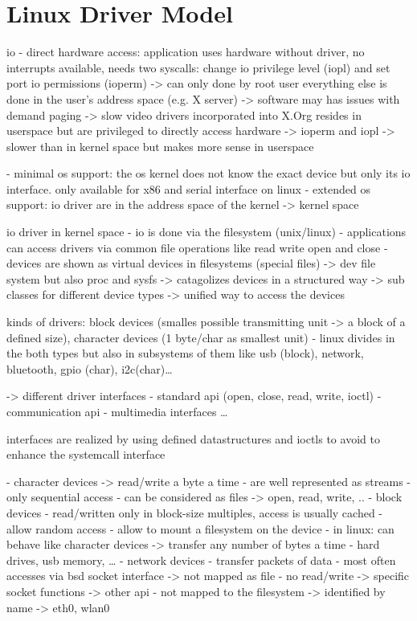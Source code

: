   
\section{Linux Driver Model}
\cite{glatz2015betriebssysteme}

io
- direct hardware access: application uses hardware without driver, no interrupts available, 
    needs two syscalls: change io privilege level (iopl) and set port io permissions (ioperm)
    -> can only done by root user
    everything else is done in the user's address space (e.g. X server) -> software may has issues with demand paging -> slow
    \cite{lfd430}
    video drivers incorporated into X.Org resides in userspace but are privileged to directly access hardware -> ioperm and iopl
    -> slower than in kernel space but makes more sense in userspace

- minimal os support: the os kernel does not know the exact device but only its io interface. only available for x86 and serial interface on linux
- extended os support: io driver are in the address space of the kernel -> kernel space

io driver in kernel space
- io is done via the filesystem (unix/linux)
- applications can access drivers via common file operations like read write open and close
    - devices are shown as virtual devices in filesystems (special files) -> dev file system but also proc and sysfs
    -> catagolizes devices in a structured way -> sub classes for different device types -> unified way to access the devices

kinds of drivers: block devices (smalles possible transmitting unit -> a block of a defined size), character devices (1 byte/char as smallest unit)
\cite{quade2016Linux}
- linux divides in the both types but also in subsystems of them like usb (block), network, bluetooth, gpio (char), i2c(char)\ldots

\cite{quade2016Linux}
-> different driver interfaces
    - standard api (open, close, read, write, ioctl)
    - communication api
    - multimedia interfaces \ldots

    interfaces are realized by using defined datastructures and ioctls to avoid to enhance the systemcall interface

\cite{lfd430}
- character devices -> read/write a byte a time
    - are well represented as streams
    - only sequential access
    - can be considered as files -> open, read, write, ..
- block devices
    - read/written only in block-size multiples, access is usually cached
    - allow random access
    - allow to mount a filesystem on the device
    - in linux: can behave like character devices -> transfer any number of bytes a time
    - hard drives, usb memory, \ldots
- network devices
    - transfer packets of data
    - most often accesses via bsd socket interface -> not mapped as file
    - no read/write -> specific socket functions -> other api
    - not mapped to the filesystem -> identified by name -> eth0, wlan0


